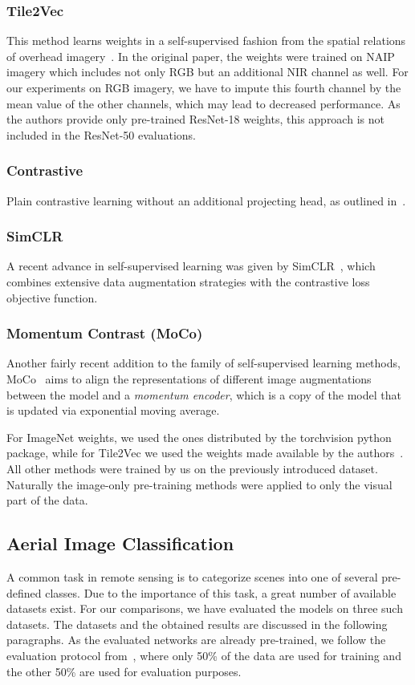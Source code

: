 \documentclass[journal]{IEEEtran}
\begin{document}
\subsubsection{Tile2Vec}
This method learns weights in a self-supervised fashion from the spatial relations
of overhead imagery~\cite{tile2vec}.
In the original paper,
the weights were trained on NAIP imagery which includes not only RGB but an additional NIR channel
as well.
For our experiments on RGB imagery,
we have to impute this fourth channel by the mean value of the other channels,
which may lead to decreased performance.
As the authors provide only pre-trained ResNet-18 weights,
this approach is not included in the ResNet-50 evaluations.
\subsubsection{Contrastive}
Plain contrastive learning without an additional projecting head,
as outlined in~\cite{simclr}.
\subsubsection{SimCLR}
A recent advance in self-supervised learning was given by SimCLR~\cite{simclr},
which combines extensive data augmentation strategies
with the contrastive loss objective function.
\subsubsection{Momentum Contrast (MoCo)}
Another fairly recent addition to the family of self-supervised learning methods,
MoCo~\cite{he_momentum_2020} aims to align the representations
of different image augmentations between the model and a \emph{momentum encoder},
which is a copy of the model that is updated via exponential moving average.

For ImageNet weights, we used the ones distributed by the torchvision python package,
while for Tile2Vec we used the weights made available by the authors~\cite{tile2vec}.
All other methods were trained by us on the previously introduced dataset.
Naturally the image-only pre-training methods were applied to only the visual part of the data.

\subsection{Aerial Image Classification}
A common task in remote sensing is to categorize scenes into one of several pre-defined classes.
Due to the importance of this task, a great number of available datasets exist.
For our comparisons, we have evaluated the models on three such datasets.
The datasets and the obtained results are discussed in the following paragraphs.
As the evaluated networks are already pre-trained,
we follow the evaluation protocol from~\cite{xia_aid_2017},
where only 50\% of the data are used for training
and the other 50\% are used for evaluation purposes.
\end{document}
